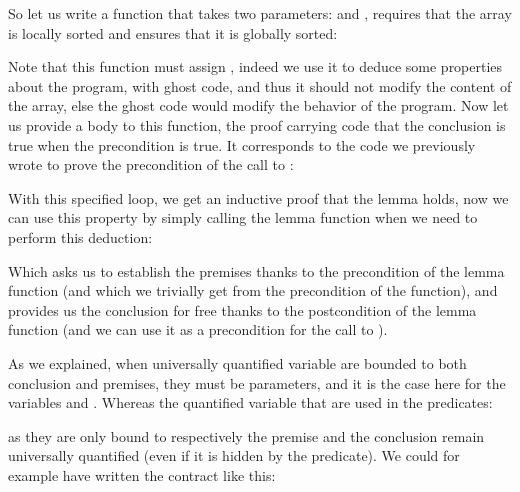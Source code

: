 So let us write a function that takes two parameters:  and
, requires that the array is locally sorted and ensures that it
is globally sorted:






Note that this function must assign , indeed
we use it to deduce some properties about the program, with ghost code, and
thus it should not modify the content of the array, else the ghost code would
modify the behavior of the program. Now let us provide a body to this function,
the proof carrying code that the conclusion is true when the precondition is true.
It corresponds to the code we previously wrote to prove the precondition of
the call to :






With this specified loop, we get an inductive proof that the lemma holds,
now we can use this property by simply calling the lemma function when we need
to perform this deduction:






Which asks us to establish the premises thanks to the precondition of the lemma
function (and which we trivially get from the precondition of the
 function), and provides us the conclusion for free
thanks to the postcondition of the lemma function (and we can use it as a
precondition for the call to ).



As we explained, when universally quantified variable are bounded to both
conclusion and premises, they must be parameters, and it is the case here for
the variables  and . Whereas the quantified
variable that are used in the predicates:






as they are only bound to respectively the premise and the conclusion remain
universally quantified (even if it is hidden by the predicate). We could for
example have written the contract like this:



